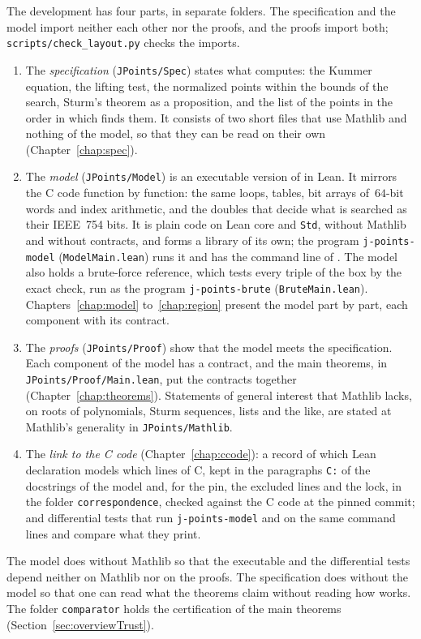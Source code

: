 The development has four parts, in separate folders. The specification and the model import neither
each other nor the proofs, and the proofs import both; \verb|scripts/check_layout.py| checks the
imports.
\begin{enumerate}
  \item The \emph{specification} (\verb|JPoints/Spec|) states what \jpoints{} computes: the Kummer
    equation, the lifting test, the normalized points within the bounds of the search, Sturm's
    theorem as a proposition, and the list of the points in the order in which \jpoints{} finds
    them. It consists of two short files that use Mathlib and nothing of the model, so that they can
    be read on their own (Chapter~\ref{chap:spec}).
  \item The \emph{model} (\verb|JPoints/Model|) is an executable version of \jpoints{} in Lean. It
    mirrors the C code function by function: the same loops, tables, bit arrays of~$64$-bit words
    and index arithmetic, and the doubles that decide what is searched as their IEEE~754 bits. It is
    plain code on Lean core and \verb|Std|, without Mathlib and without contracts, and forms a
    library of its own; the program \verb|j-points-model| (\verb|ModelMain.lean|) runs it and has
    the command line of \jpoints{}. The model also holds a brute-force reference, which tests every
    triple of the box by the exact check, run as the program \verb|j-points-brute|
    (\verb|BruteMain.lean|). Chapters~\ref{chap:model} to~\ref{chap:region} present the model part
    by part, each component with its contract.
  \item The \emph{proofs} (\verb|JPoints/Proof|) show that the model meets the specification. Each
    component of the model has a contract, and the main theorems, in \verb|JPoints/Proof/Main.lean|,
    put the contracts together (Chapter~\ref{chap:theorems}). Statements of general interest that
    Mathlib lacks, on roots of polynomials, Sturm sequences, lists and the like, are stated at
    Mathlib's generality in \verb|JPoints/Mathlib|.
  \item The \emph{link to the C code} (Chapter~\ref{chap:ccode}): a record of which Lean declaration
    models which lines of C, kept in the paragraphs \verb|C:| of the docstrings of the model and,
    for the pin, the excluded lines and the lock, in the folder \verb|correspondence|, checked
    against the C code at the pinned commit; and differential tests that run \verb|j-points-model|
    and \jpoints{} on the same command lines and compare what they print.
\end{enumerate}
The model does without Mathlib so that the executable and the differential tests depend neither on
Mathlib nor on the proofs. The specification does without the model so that one can read what the
theorems claim without reading how \jpoints{} works. The folder \verb|comparator| holds the
certification of the main theorems (Section~\ref{sec:overviewTrust}).

